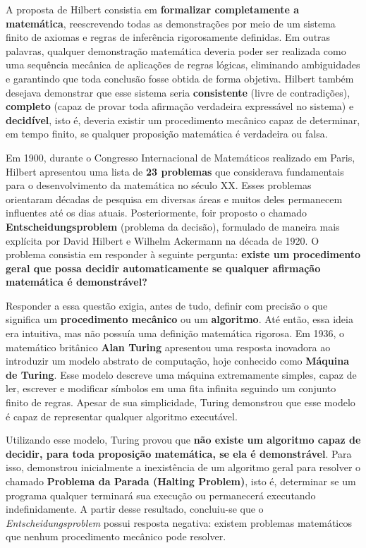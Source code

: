 \documentclass[
  brazilian,
  letterpaper,
]{book}
\theoremstyle{plain}
\theoremstyle{definition}
\theoremstyle{remark}
\begin{document}
A proposta de Hilbert consistia em \textbf{formalizar completamente a
matemática}, reescrevendo todas as demonstrações por meio de um sistema
finito de axiomas e regras de inferência rigorosamente definidas. Em
outras palavras, qualquer demonstração matemática deveria poder ser
realizada como uma sequência mecânica de aplicações de regras lógicas,
eliminando ambiguidades e garantindo que toda conclusão fosse obtida de
forma objetiva. Hilbert também desejava demonstrar que esse sistema
seria \textbf{consistente} (livre de contradições), \textbf{completo}
(capaz de provar toda afirmação verdadeira expressável no sistema) e
\textbf{decidível}, isto é, deveria existir um procedimento mecânico
capaz de determinar, em tempo finito, se qualquer proposição matemática
é verdadeira ou falsa.

Em 1900, durante o Congresso Internacional de Matemáticos realizado em
Paris, Hilbert apresentou uma lista de \textbf{23 problemas} que
considerava fundamentais para o desenvolvimento da matemática no século
XX. Esses problemas orientaram décadas de pesquisa em diversas áreas e
muitos deles permanecem influentes até os dias atuais. Posteriormente,
foir proposto o chamado \textbf{Entscheidungsproblem} (problema da
decisão), formulado de maneira mais explícita por David Hilbert e
Wilhelm Ackermann na década de 1920. O problema consistia em responder à
seguinte pergunta: \textbf{existe um procedimento geral que possa
decidir automaticamente se qualquer afirmação matemática é
demonstrável?}

Responder a essa questão exigia, antes de tudo, definir com precisão o
que significa um \textbf{procedimento mecânico} ou um
\textbf{algoritmo}. Até então, essa ideia era intuitiva, mas não possuía
uma definição matemática rigorosa. Em 1936, o matemático britânico
\textbf{Alan Turing} apresentou uma resposta inovadora ao introduzir um
modelo abstrato de computação, hoje conhecido como \textbf{Máquina de
Turing}. Esse modelo descreve uma máquina extremamente simples, capaz de
ler, escrever e modificar símbolos em uma fita infinita seguindo um
conjunto finito de regras. Apesar de sua simplicidade, Turing demonstrou
que esse modelo é capaz de representar qualquer algoritmo executável.

Utilizando esse modelo, Turing provou que \textbf{não existe um
algoritmo capaz de decidir, para toda proposição matemática, se ela é
demonstrável}. Para isso, demonstrou inicialmente a inexistência de um
algoritmo geral para resolver o chamado \textbf{Problema da Parada
(Halting Problem)}, isto é, determinar se um programa qualquer terminará
sua execução ou permanecerá executando indefinidamente. A partir desse
resultado, concluiu-se que o \emph{Entscheidungsproblem} possui resposta
negativa: existem problemas matemáticos que nenhum procedimento mecânico
pode resolver.
\end{document}
